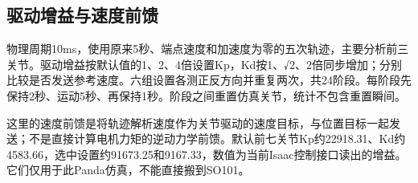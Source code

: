 \label{stage:s04}

\subsection{驱动增益与速度前馈}\label{s04-detail-1}

物理周期10ms，使用原来5秒、端点速度和加速度为零的五次轨迹，主要分析前三关节。驱动增益按默认值的1、2、4倍设置Kp，Kd按1、√2、2倍同步增加；分别比较是否发送参考速度。六组设置各测正反方向并重复两次，共24阶段。每阶段先保持2秒、运动5秒、再保持1秒。阶段之间重置仿真关节，统计不包含重置瞬间。

这里的速度前馈是将轨迹解析速度作为关节驱动的速度目标，与位置目标一起发送；不是直接计算电机力矩的逆动力学前馈。默认前七关节Kp约22918.31、Kd约4583.66，选中设置约91673.25和9167.33，数值为当前Isaac控制接口读出的增益。它们仅用于此Panda仿真，不能直接搬到SO101。

